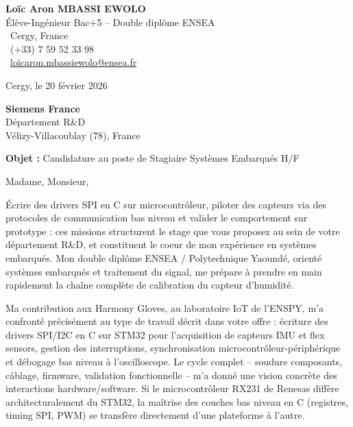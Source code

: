 \documentclass[a4paper,11pt]{article}
\begin{document}
\noindent
\begin{minipage}[t]{0.5\textwidth}
    \textbf{Loïc Aron MBASSI EWOLO}\\
    Élève-Ingénieur Bac+5 -- Double diplôme ENSEA\\[3pt]
    \faMapMarker\ Cergy, France\\
    \faPhone\ (+33) 7 59 52 33 98\\
    \faEnvelope\ \href{mailto:loicaron.mbassiewolo@ensea.fr}{loicaron.mbassiewolo@ensea.fr}
\end{minipage}
\hfill
\begin{minipage}[t]{0.4\textwidth}
    \raggedleft
    Cergy, le 20 février 2026
\end{minipage}

\vspace{1.2cm}

\hfill
\begin{minipage}[t]{0.5\textwidth}
    \raggedleft
    \textbf{Siemens France}\\
    Département R\&D\\
    Vélizy-Villacoublay (78), France
\end{minipage}

\vspace{1cm}

\noindent\textbf{Objet :} Candidature au poste de Stagiaire Systèmes Embarqués H/F

\vspace{0.8cm}

Madame, Monsieur,

Écrire des drivers SPI en C sur microcontrôleur, piloter des capteurs via des protocoles de communication bas niveau et valider le comportement sur prototype : ces missions structurent le stage que vous proposez au sein de votre département R\&D, et constituent le coeur de mon expérience en systèmes embarqués. Mon double diplôme ENSEA / Polytechnique Yaoundé, orienté systèmes embarqués et traitement du signal, me prépare à prendre en main rapidement la chaîne complète de calibration du capteur d'humidité.

Ma contribution aux Harmony Gloves, au laboratoire IoT de l'ENSPY, m'a confronté précisément au type de travail décrit dans votre offre : écriture des drivers SPI/I2C en C sur STM32 pour l'acquisition de capteurs IMU et flex sensors, gestion des interruptions, synchronisation microcontrôleur-périphérique et débogage bas niveau à l'oscilloscope. Le cycle complet -- soudure composants, câblage, firmware, validation fonctionnelle -- m'a donné une vision concrète des interactions hardware/software. Si le microcontrôleur RX231 de Renesas diffère architecturalement du STM32, la maîtrise des couches bas niveau en C (registres, timing SPI, PWM) se transfère directement d'une plateforme à l'autre.
\end{document}
